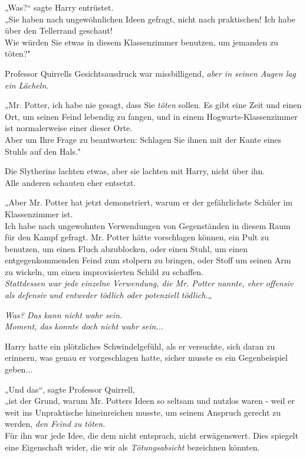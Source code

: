 {„Was?“ sagte Harry entrüstet.\\ „Sie haben nach ungewöhnlichen Ideen gefragt, nicht nach praktischen! Ich habe über den Tellerrand geschaut!\\ Wie würden Sie etwas in diesem Klassenzimmer benutzen, um jemanden zu töten?"

Professor Quirrells Gesichtsausdruck war missbilligend, \emph{aber in seinen Augen lag ein Lächeln.}

„Mr. Potter, ich habe nie gesagt, dass Sie \emph{töten} sollen. Es gibt eine Zeit und einen Ort, um seinen Feind lebendig zu fangen, und in einem Hogwarts-Klassenzimmer ist normalerweise einer dieser Orte.\\ Aber um Ihre Frage zu beantworten: Schlagen Sie ihnen mit der Kante eines Stuhls auf den Hals."

Die Slytherins lachten etwas, aber sie lachten mit Harry, nicht über ihn.\\ Alle anderen schauten eher entsetzt.

„Aber Mr. Potter hat jetzt demonstriert, warum er der gefährlichste Schüler im Klassenzimmer ist.\\ Ich habe nach ungewohnten Verwendungen von Gegenständen in diesem Raum für den Kampf gefragt. Mr. Potter hätte vorschlagen können, ein Pult zu benutzen, um einen Fluch abzublocken, oder einen Stuhl, um einen entgegenkommenden Feind zum stolpern zu bringen, oder Stoff um seinen Arm zu wickeln, um einen improvisierten Schild zu schaffen.\\ \emph{Stattdessen war jede einzelne Verwendung, die Mr. Potter nannte, eher offensiv als defensiv und entweder tödlich oder potenziell tödlich.}„

\emph{Was? Das kann nicht wahr sein.\\ } \emph{Moment, das konnte doch nicht wahr sein...}

Harry hatte ein plötzliches Schwindelgefühl, als er versuchte, sich daran zu erinnern, was genau er vorgeschlagen hatte, sicher musste es ein Gegenbeispiel geben...

„Und das“, sagte Professor Quirrell,\\ „ist der Grund, warum Mr. Potters Ideen so seltsam und nutzlos waren - weil er weit ins Unpraktische hineinreichen musste, um seinem Anspruch gerecht zu werden, \emph{den Feind zu töten.}\\ Für ihn war jede Idee, die dem nicht entsprach, nicht erwägenswert. Dies spiegelt eine Eigenschaft wider, die wir als \emph{Tötungsabsicht} bezeichnen könnten.

}
